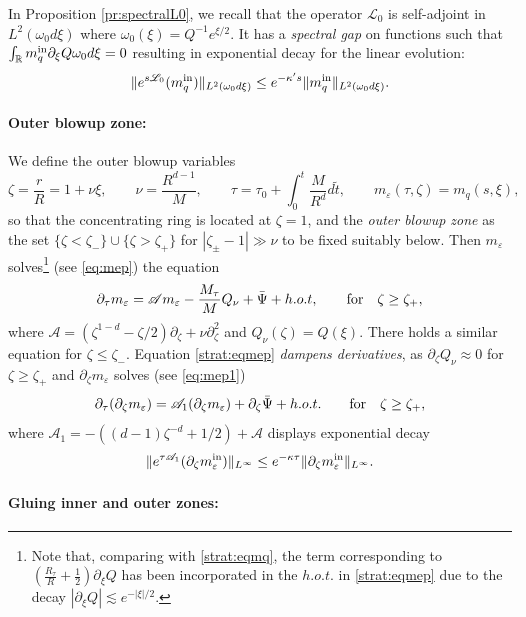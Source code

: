 \documentclass[11pt]{aims}
\theoremstyle{definition}
\newcommand{\ep}{\varepsilon}
\newcommand{\Ls}{\mathscr{L}}
\newcommand{\As}{\mathscr{A}}
\newcommand{\pa}{\partial}
\newcommand{\inn}{\textup{in}}
\newcommand{\be}{\begin{equation}}
\newcommand{\ee}{\end{equation}}
\numberwithin{equation}{section}
\begin{document}
In Proposition \ref{pr:spectralL0}, we recall that the operator $\Ls_0$ is self-adjoint in $L^2(\omega_0d\xi)$ where $\omega_0(\xi)=Q^{-1} e^{\xi/2}$. It has a \emph{spectral gap} on functions such that $\int_{\mathbb R}m_q^\inn \pa_\xi Q \omega_0 d\xi=0$ resulting in exponential decay for the linear evolution:
\be \label{strat:decayinn}
\| e^{s\Ls_0} (m_q^\inn) \|_{L^2(\omega_0d\xi)}\leq e^{-\kappa' s }\|  m_q^\inn \|_{L^2(\omega_0d\xi)}.
\ee

\paragraph{Outer blowup zone:} We define the outer blowup variables
$$
\zeta=\frac{r}{R}=1+\nu \xi, \qquad \nu =\frac{R^{d-1}}{M}, \qquad \tau=\tau_0+\int_0^t \frac{M}{R^d}d\tilde t, \qquad m_\varepsilon(\tau,\zeta)=m_q(s,\xi),
$$
so that the concentrating ring is located at $\zeta=1$, and the \emph{outer blowup zone} as the set $\{\zeta<\zeta_-\}\cup \{\zeta > \zeta_+\}$ for $|\zeta_{\pm}-1|\gg \nu$ to be fixed suitably below. Then $m_\ep$ solves\footnote{Note that, comparing with \eqref{strat:eqmq}, the term corresponding to $(\frac{R_\tau}{R}+\frac{1}{2}) \pa_\xi Q$ has been incorporated in the $h.o.t.$ in \eqref{strat:eqmep} due to the decay $|\pa_\xi Q|\lesssim e^{-|\xi|/2}$.} (see \eqref{eq:mep}) the equation
\be \label{strat:eqmep}
\pa_\tau m_\ep = \As m_\ep   - \frac{M_\tau}{M} Q_\nu+\bar \Psi+h.o.t,  \qquad \textup{for}\quad  \zeta \geq \zeta_+,
\ee
where $\As = \left( \zeta^{1-d} - \zeta/2 \right) \pa_\zeta   + \nu \pa_\zeta^2$ and $Q_\nu (\zeta)=Q(\xi)$. There holds a similar equation for $\zeta\leq \zeta_-$. Equation \eqref{strat:eqmep} \emph{dampens derivatives}, as $\pa_\zeta Q_\nu \approx 0$ for $\zeta\geq \zeta_+$ and $\pa_\zeta m_\ep$ solves (see \eqref{eq:mep1})
\begin{equation}\label{strat:eq:mep1}
\pa_\tau (\pa_\zeta m_{\ep})= \As_1(\pa_\zeta m_{\ep}) +\pa_\zeta \bar \Psi+h.o.t. \qquad \textup{for}\quad  \zeta \geq \zeta_+,
\end{equation}
where $\As_1= -( (d-1)\zeta^{-d} +1/2 )+\As$ displays exponential decay
\be \label{strat:decayout}
\| e^{\tau \As_1} (\pa_\zeta m_\varepsilon^\inn )\|_{L^\infty }\leq e^{-\kappa \tau }\| \pa_\zeta m_\varepsilon^\inn \|_{L^\infty }.
\ee

\paragraph{Gluing inner and outer zones:}
\end{document}
